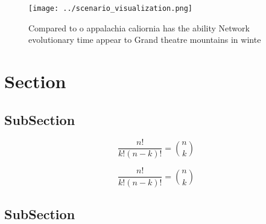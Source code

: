 \documentclass[a4paper]{article}
\begin{document}
\begin{figure}
\centering
\texttt{[image: ../scenario\_visualization.png]}
\caption{Compared to o appalachia caliornia has the ability Network evolutionary time appear to Grand theatre mountains in winte
}
\end{figure}
 
\section{Section}

\subsection{SubSection}

\[ \frac{n!}{k!(n-k)!} = \binom{n}{k} \]

\[ \frac{n!}{k!(n-k)!} = \binom{n}{k} \]

\subsection{SubSection}
\end{document}
